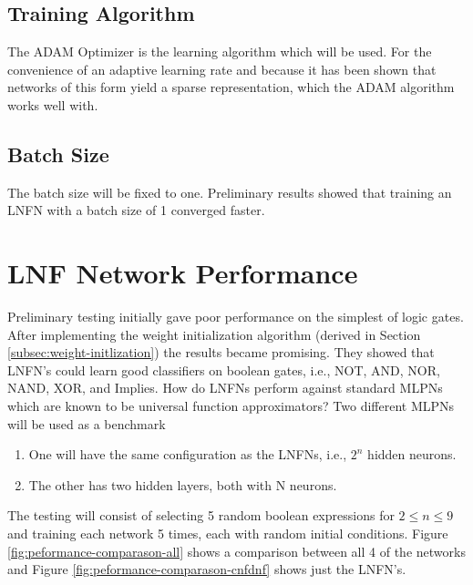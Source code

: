 \subsection{Training Algorithm}
The ADAM Optimizer \cite{kingma2014adam} is the learning algorithm which will be used. For the convenience of an adaptive learning rate and because it has been shown that networks of this form yield a sparse representation, which the ADAM algorithm works well with.

\subsection{Batch Size}
The batch size will be fixed to one. Preliminary results showed that training an LNFN with a batch size of 1 converged faster. 

\section{LNF Network Performance}
Preliminary testing initially gave poor performance on the simplest of logic gates. After implementing the weight initialization algorithm (derived in Section \ref{subsec:weight-initlization}) the results became promising. They showed that LNFN's could learn good classifiers on boolean gates, i.e., NOT, AND, NOR, NAND, XOR, and Implies. How do LNFNs perform against standard MLPNs which are known to be universal function approximators? Two different MLPNs will be used as a benchmark

\begin{enumerate}
	\item One will have the same configuration as the LNFNs, i.e., $2^n$ hidden neurons. \label{lnfn-peformance:mlpn-arch-1}
	\item The other has two hidden layers, both with N neurons.
\end{enumerate}

The testing will consist of selecting 5 random boolean expressions for $2 \leq n \leq 9$ and training each network 5 times, each with random initial conditions. Figure \ref{fig:peformance-comparason-all} shows a comparison between all 4 of the networks and Figure \ref{fig:peformance-comparason-cnfdnf} shows just the LNFN's.

